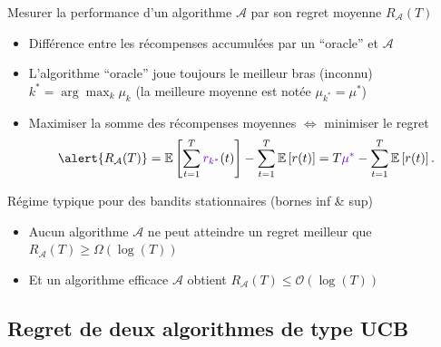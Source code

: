 \documentclass[11pt,french,ignorenonframetext,]{beamer}
\begin{document}
\begin{frame}{Mesurer la performance d'un algorithme $\mathcal{A}$ par son regret moyenne $R_{\mathcal{A}}(T)$}

\begin{itemize}
  \item
  Différence entre les récompenses accumulées par un ``oracle'' et $\mathcal{A}$

  \item
  L'algorithme ``oracle'' joue toujours \textcolor{deeppurple}{le meilleur bras (inconnu) $k^* = \arg\max_k \mu_k$} (la meilleure moyenne est notée \textcolor{deeppurple}{$\mu_{k^*} = \mu^*$})

  \item
  Maximiser la somme des récompenses moyennes
  $\Longleftrightarrow$ \alert{minimiser le regret}
  \[ \alert{ R_{\mathcal{A}}(T) } = \mathbb{E}\left[ \sum\limits_{t=1}^T \textcolor{deeppurple}{r_{k^*}}(t) \right] - \sum\limits_{t=1}^T \mathbb{E}\left[ r(t) \right] = T \textcolor{deeppurple}{\mu^*} - \sum\limits_{t=1}^T \mathbb{E}\left[ r(t) \right]. \]

\end{itemize}

\pause
\vspace*{10pt}

\begin{exampleblock}{Régime typique pour des bandits stationnaires (bornes inf \& sup)}
  \begin{itemize}
  \item
  Aucun algorithme $\mathcal{A}$ ne peut atteindre un regret meilleur que
  \hfill{}
  $R_{\mathcal{A}}(T) \geq \Omega(\log(T))$

  \item
  Et un algorithme efficace $\mathcal{A}$ obtient
  \hfill{}
  $R_{\mathcal{A}}(T) \leq \mathcal{O}(\log(T))$
  \end{itemize}
\end{exampleblock}

\end{frame}

\subsection{\hfill{}Regret de deux algorithmes de type UCB\hfill{}}
\end{document}
